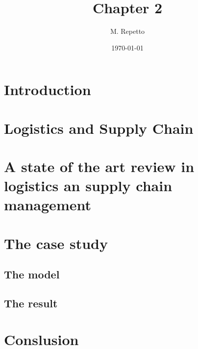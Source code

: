 \documentclass{article}
\begin{document}
\title{Chapter 2}

\author{M. Repetto}

\date{\today}

\maketitle

\begin{abstract}

\end{abstract}

\section{Introduction}

\section{Logistics and Supply Chain}

\section{A state of the art review in logistics an supply chain management}

\section{The case study}
\subsection{The model}
\subsection{The result}

\section{Conslusion}
\end{document}
